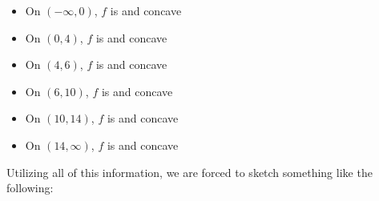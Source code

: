 \documentclass{ximera}
\begin{document}
\begin{example}
\begin{explanation}
\begin{hint}
	\begin{itemize}
	\item On $(-\infty, 0)$, $f$ is  and concave  
	\item On $(0, 4)$, $f$ is  and concave 
	\item On $(4, 6)$, $f$ is  and concave 
	\item On $(6, 10)$, $f$ is  and concave 
	\item On $(10, 14)$, $f$ is  and concave 
	\item On $(14, \infty)$, $f$ is  and concave 
	\end{itemize}
    \end{hint}

    \begin{hint}
      Utilizing all of this information, we are forced to sketch something like the following:
      

\end{hint}
\end{explanation}
\end{example}
\end{document}
